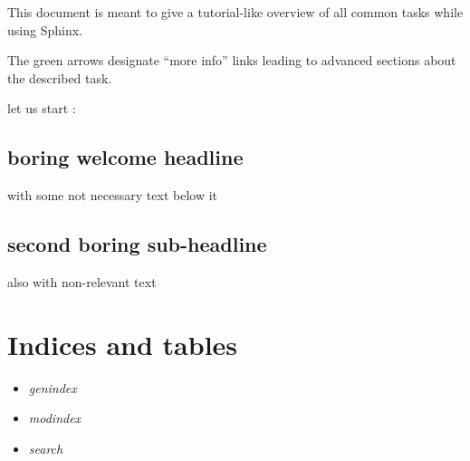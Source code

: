 \documentclass[letterpaper,10pt,english]{sphinxmanual}
\begin{document}
This document is meant to give a tutorial-like overview of all common tasks
while using Sphinx.

The green arrows designate ``more info'' links leading to advanced sections about
the described task.

let us start :


\section{boring welcome headline}
\label{goblindice_start:boring-welcome-headline}
with some not necessary text below it


\section{second boring sub-headline}
\label{goblindice_start:second-boring-sub-headline}
also with non-relevant text


\chapter{Indices and tables}
\label{index:indices-and-tables}\begin{itemize}
\item {} 
\emph{genindex}

\item {} 
\emph{modindex}

\item {} 
\emph{search}

\end{itemize}



\renewcommand{\indexname}{Index}
\printindex
\end{document}
